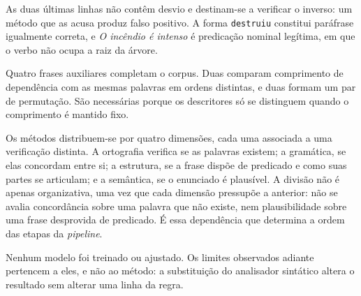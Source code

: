 As duas últimas linhas não contêm desvio e destinam-se a verificar o inverso: um método que
as acusa produz falso positivo. A forma \texttt{destruiu} constitui paráfrase igualmente
correta, e \emph{O incêndio é intenso} é predicação nominal legítima, em que o verbo não
ocupa a raiz da árvore.

Quatro frases auxiliares completam o corpus. Duas comparam comprimento de dependência com as
mesmas palavras em ordens distintas, e duas formam um par de permutação. São necessárias
porque os descritores só se distinguem quando o comprimento é mantido fixo.

Os métodos distribuem-se por quatro dimensões, cada uma associada a uma verificação
distinta. A ortografia verifica se as palavras existem; a gramática, se elas concordam entre
si; a estrutura, se a frase dispõe de predicado e como suas partes se articulam; e a
semântica, se o enunciado é plausível. A divisão não é apenas organizativa, uma vez que cada
dimensão pressupõe a anterior: não se avalia concordância sobre uma palavra que não existe,
nem plausibilidade sobre uma frase desprovida de predicado. É essa dependência que determina
a ordem das etapas da \emph{pipeline}.

Nenhum modelo foi treinado ou ajustado. Os limites observados adiante pertencem a eles, e não ao método: a substituição do analisador sintático
altera o resultado sem alterar uma linha da regra.
